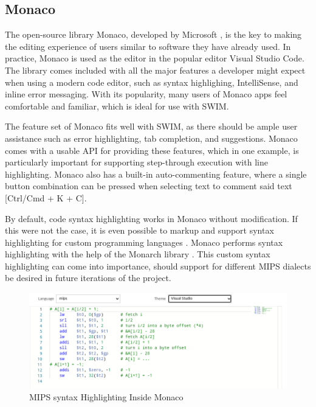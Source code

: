 \documentclass[
    paper=letter,
    parskip=half,
    fontsize=12pt,
    titlepage=firstiscover,
    toc=bibliography,
    numbers=endperiod
]{scrartcl}
\begin{document}
\subsection{Monaco}
\label{subsec:monaco}

The open-source library Monaco, developed by Microsoft \cite{monaco}, is
the key to making the editing experience of users similar to software
they have already used. In practice, Monaco is used as the editor in the
popular editor Visual Studio Code. The library comes included with all
the major features a developer might expect when using a modern code
editor, such as syntax highlighing, IntelliSense, and inline error
messaging. With its popularity, many users of Monaco apps feel
comfortable and familiar, which is ideal for use with SWIM.

The feature set of Monaco fits well with SWIM, as there should be ample
user assistance such as error highlighting, tab completion, and
suggestions. Monaco comes with a usable API for providing these
features, which in one example, is particularly important for supporting
step-through execution with line highlighting. Monaco also has a
built-in auto-commenting feature, where a single button combination can
be pressed when selecting text to comment said text {[}Ctrl/Cmd + K +
C{]}.

By default, code syntax highlighting works in Monaco without
modification. If this were not the case, it is even possible to markup
and support syntax highlighting for custom programming languages
\cite{monaco-custom-languages}. Monaco performs syntax highlighting with
the help of the Monarch library \cite{monarch}. This custom syntax
highlighting can come into importance, should support for different MIPS
dialects be desired in future iterations of the project.

\begin{figure}[H]
    \includegraphics[width=\textwidth]{monaco-mips-syntax-highlighting}
    \caption{MIPS syntax Highlighting Inside Monaco}
\end{figure}
\end{document}
